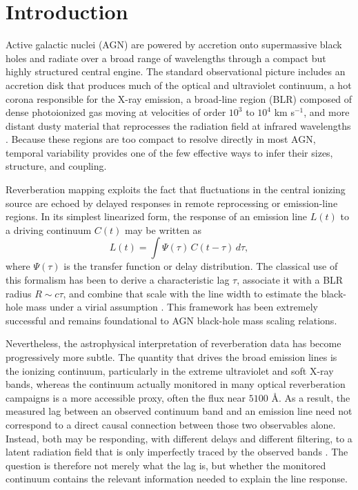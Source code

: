 \documentclass[fleqn,usenatbib]{mnras}
\begin{document}
\section{Introduction}

Active galactic nuclei (AGN) are powered by accretion onto supermassive black holes and radiate over a broad range of wavelengths through a compact but highly structured central engine. The standard observational picture includes an accretion disk that produces much of the optical and ultraviolet continuum, a hot corona responsible for the X-ray emission, a broad-line region (BLR) composed of dense photoionized gas moving at velocities of order \(10^3\) to \(10^4\) km s\(^{-1}\), and more distant dusty material that reprocesses the radiation field at infrared wavelengths \cite{Peterson2004,Netzer2013,Cackett2021}. Because these regions are too compact to resolve directly in most AGN, temporal variability provides one of the few effective ways to infer their sizes, structure, and coupling.

Reverberation mapping exploits the fact that fluctuations in the central ionizing source are echoed by delayed responses in remote reprocessing or emission-line regions. In its simplest linearized form, the response of an emission line \(L(t)\) to a driving continuum \(C(t)\) may be written as
\begin{equation}
L(t) = \int \Psi(\tau)\,C(t-\tau)\,d\tau,
\end{equation}
where \(\Psi(\tau)\) is the transfer function or delay distribution. The classical use of this formalism has been to derive a characteristic lag \(\tau\), associate it with a BLR radius \(R \sim c\tau\), and combine that scale with the line width to estimate the black-hole mass under a virial assumption \cite{Peterson2004,BentzKatz2015}. This framework has been extremely successful and remains foundational to AGN black-hole mass scaling relations.

Nevertheless, the astrophysical interpretation of reverberation data has become progressively more subtle. The quantity that drives the broad emission lines is the ionizing continuum, particularly in the extreme ultraviolet and soft X-ray bands, whereas the continuum actually monitored in many optical reverberation campaigns is a more accessible proxy, often the flux near \(5100\) \AA. As a result, the measured lag between an observed continuum band and an emission line need not correspond to a direct causal connection between those two observables alone. Instead, both may be responding, with different delays and different filtering, to a latent radiation field that is only imperfectly traced by the observed bands \cite{Cackett2021}. The question is therefore not merely what the lag is, but whether the monitored continuum contains the relevant information needed to explain the line response.
\end{document}
